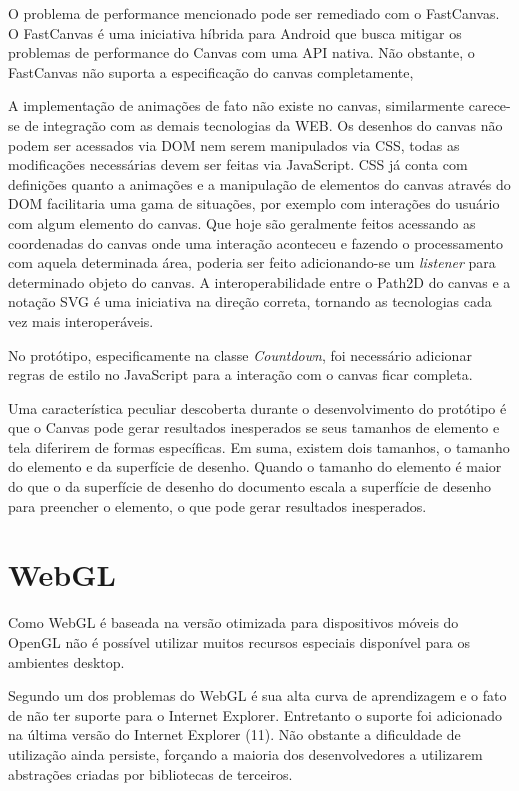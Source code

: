 \begin{draft}
O problema de performance  mencionado pode ser remediado com o FastCanvas.
O FastCanvas é uma iniciativa híbrida para Android que busca mitigar os
problemas de performance do Canvas com uma API nativa. Não obstante, o
FastCanvas não suporta a especificação do canvas completamente,

A implementação de animações de fato não existe no canvas,
similarmente carece-se de integração com as demais tecnologias
da WEB. Os desenhos do canvas não podem ser acessados via DOM nem
serem manipulados via CSS, todas as modificações necessárias devem
ser feitas via JavaScript. CSS já conta com definições quanto a
animações e a manipulação de elementos do canvas através do DOM
facilitaria uma gama de situações, por exemplo com interações do
usuário com algum elemento do canvas. Que hoje são geralmente feitos
acessando as coordenadas do canvas onde uma interação aconteceu e
fazendo o processamento com aquela determinada área, poderia ser feito
adicionando-se um \textit{listener} para determinado objeto do canvas.
A interoperabilidade entre o Path2D do canvas e a notação SVG é uma iniciativa
na direção correta, tornando as tecnologias cada vez mais interoperáveis.

No protótipo, especificamente na classe \textit{Countdown}, foi necessário
adicionar regras de estilo no JavaScript para  a interação com o canvas
ficar completa.

Uma característica peculiar descoberta durante o desenvolvimento
do protótipo é que o Canvas pode gerar resultados inesperados se
seus tamanhos de elemento e tela diferirem de formas específicas. Em
suma, existem dois tamanhos, o tamanho do elemento e da superfície de
desenho. Quando o tamanho do elemento é maior do que o da superfície
de desenho do documento escala a superfície de desenho para preencher o
elemento, o que pode gerar resultados inesperados.

\section{WebGL}

Como WebGL é baseada na versão otimizada para dispositivos móveis do
OpenGL não é possível utilizar muitos recursos especiais disponível
para os ambientes desktop.

Segundo \cite{html5mostwanted} um dos problemas do WebGL é sua alta
curva de aprendizagem e o fato de não ter suporte para o Internet
Explorer. Entretanto o suporte foi adicionado na última versão do
Internet Explorer (11). Não obstante a dificuldade de utilização
ainda persiste, forçando a maioria dos desenvolvedores a utilizarem
abstrações criadas por bibliotecas de terceiros.


\end{draft}
